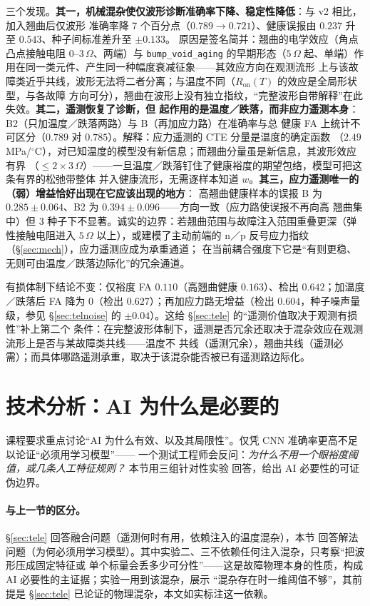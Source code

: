 \documentclass[11pt,a4paper,fontset=mac]{ctexart}
\begin{document}
三个发现。\textbf{其一，机械混杂使仅波形诊断准确率下降、稳定性降低}：与 v2 相比，加入翘曲后仅波形
准确率降 7 个百分点（$0.789\to0.721$）、健康误报由 $0.237$ 升至 $0.543$、种子间标准差升至 $\pm0.133$。
原因是签名简并：翘曲的电学效应（角点凸点接触电阻 $0$--$3\,\Omega$、两端）与 \texttt{bump\_void\_aging}
的早期形态（$5\,\Omega$ 起、单端）作用在同一类元件、产生同一种幅度衰减征象——其效应方向在观测流形
上与该故障类近乎共线，波形无法将二者分离；与温度不同（$R_\text{on}(T)$ 的效应是全局形状型，与各故障
方向可分），翘曲在波形上没有独立指纹，“完整波形自带解释”在此失效。\textbf{其二，遥测恢复了诊断，但
起作用的是温度／跌落，而非应力遥测本身}：B2（只加温度／跌落两路）与 B（再加应力路）在准确率与总
健康 FA 上统计不可区分（$0.789$ 对 $0.785$）。解释：应力遥测的 CTE 分量是温度的确定函数
（$2.49$\,MPa/$^\circ$C），对已知温度的模型没有新信息；而翘曲分量虽是新信息，其波形效应有界
（$\leq 2\times3\,\Omega$）——一旦温度／跌落钉住了健康裕度的期望包络，模型可把这条有界的松弛带整体
并入健康流形，无需逐样本知道 $w$。\textbf{其三，应力遥测唯一的（弱）增益恰好出现在它应该出现的地方}：
高翘曲健康样本的误报 B 为 $0.285\pm0.064$、B2 为 $0.394\pm0.096$——方向一致（应力路使误报不再向高
翘曲集中）但 3 种子下不显著。诚实的边界：若翘曲范围与故障注入范围重叠更深（弹性接触电阻进入
$5\,\Omega$ 以上），或建模了主动前端的 n／p 反号应力指纹（\S\ref{sec:mech}），应力遥测应成为承重通道；
在当前耦合强度下它是“有则更稳、无则可由温度／跌落边际化”的冗余通道。

有损体制下结论不变：仅裕度 FA $0.110$（高翘曲健康 $0.163$）、检出 $0.642$；加温度／跌落后
FA 降为 $0$（检出 $0.627$）；再加应力路无增益（检出 $0.604$，种子噪声量级，参见
\S\ref{sec:telnoise} 的 $\pm0.04$）。这给 \S\ref{sec:tele} 的“遥测价值取决于观测有损性”补上第二个
条件：在完整波形体制下，遥测是否冗余还取决于混杂效应在观测流形上是否与某故障类共线——温度不
共线（遥测冗余），翘曲共线（遥测必需）；而具体哪路遥测承重，取决于该混杂能否被已有遥测路边际化。

\section{技术分析：AI 为什么是必要的}\label{sec:why}

课程要求重点讨论“AI 为什么有效、以及其局限性”。仅凭 CNN 准确率更高不足以论证“必须用学习模型”——
一个测试工程师会反问：\emph{为什么不用一个眼裕度阈值，或几条人工特征规则？} 本节用三组针对性实验
回答，给出 AI 必要性的可证伪边界。

\paragraph{与上一节的区分。} §\ref{sec:tele} 回答融合问题（遥测何时有用，依赖注入的温度混杂），本节
回答解法问题（为何必须用学习模型）。其中实验二、三不依赖任何注入混杂，只考察“把波形压成固定特征或
单个标量会丢多少可分性”——这是故障物理本身的性质，构成 AI 必要性的主证据；实验一用到该混杂，展示
“混杂存在时一维阈值不够”，其前提是 §\ref{sec:tele} 已论证的物理混杂，本文如实标注这一依赖。
\end{document}
